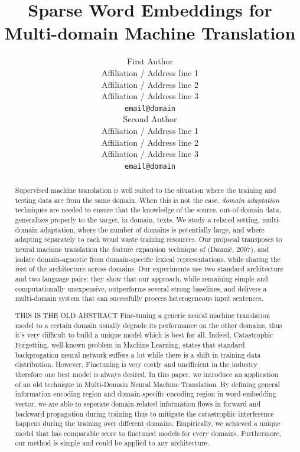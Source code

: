 \documentclass[11pt,a4paper]{article}
\title{Sparse Word Embeddings for Multi-domain Machine Translation}
\author{First Author \\%
  Affiliation / Address line 1 \\
  Affiliation / Address line 2 \\
  Affiliation / Address line 3 \\
  {\tt email@domain} \\\And
  Second Author \\
  Affiliation / Address line 1 \\
  Affiliation / Address line 2 \\
  Affiliation / Address line 3 \\
  {\tt email@domain} \\}
\date{}
\newcommand{\fyDone}[1]{\done[FY]\Todo[FY:]{\textcolor{orange}{#1}}}
\begin{document}
\maketitle

\fyDone{s/naacl/EMNLP/g}
\fyDone{Too long, selfcontained, noref, rewrite}
\begin{abstract}
  Supervised machine translation is well suited to the situation where the training and testing data are from the same domain. When this is not the case, \emph{domain adaptation} techniques are needed to ensure that the knowledge of the source, out-of-domain data, generalizes properly to the target, in domain, texts. We study a related setting, multi-domain adaptation, where the number of domains is potentially large, and where adapting separately to each woud waste training resources. Our proposal transposes to neural machine translation the feature expansion technique of (Daum\'e, 2007), and isolate domain-agnostic from domain-specific lexical representations, while sharing the rest of the architecture across domains. Our experiments use two standard architecture and two language pairs: they show that our approach, while remaining simple and computationally unexpensive, outperforms several strong baselines, and delivers a multi-domain system that can sucessfully process heterogeneous input sentences.

  THIS IS THE OLD ABSTRACT 
  Fine-tuning a generic neural machine translation model to a certain domain usually degrade its performance on the other domains, thus it's very difficult to build a unique model which is best for all. Indeed, Catastrophic Forgetting, well-known problem in Machine Learning, states that standard backprogation neural network suffers a lot while there is a shift in training data distribution. However, Finetuning is very costly and unefficient in the industry therefore one best model is always desired. In this paper, we introduce an application of an old technique \cite{Daume07frustratingly} in Multi-Domain Neural Machine Translation. By defining general information encoding region and domain-specific encoding region in word embedding vector, we are able to seperate domain-related information flows in forward and backward propagation during training thus to
mitigate the catastrophic interference happens during the training over different domains. Empirically, we achieved a unique model that has comparable score to finetuned models for every domains. Furthermore, our method is simple and could be applied to any architecture.
\end{abstract}
\end{document}
